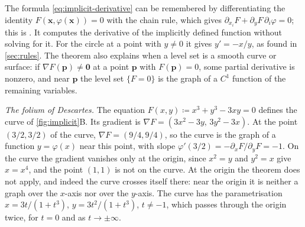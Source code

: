 The formula \eqref{eq:implicit-derivative} can be remembered by differentiating the identity $F(\mathbf x,\varphi(\mathbf x))=0$ with the chain rule, which gives $\partial_{x_i}F+\partial_yF\,\partial_i\varphi=0$; this is . It computes the derivative of the implicitly defined function without solving for it. For the circle at a point with $y\ne0$ it gives $y'=-x/y$, as found in \cref{sec:rules}. The theorem also explains when a level set is a smooth curve or surface: if $\nabla F(\mathbf p)\ne\mathbf0$ at a point $\mathbf p$ with $F(\mathbf p)=0$, some partial derivative is nonzero, and near $\mathbf p$ the level set $\{F=0\}$ is the graph of a $C^1$ function of the remaining variables.

\emph{The folium of Descartes.} The equation $F(x,y)\coloneqq x^3+y^3-3xy=0$ defines the curve of \cref{fig:implicit}B. Its gradient is $\nabla F=(3x^2-3y,\,3y^2-3x)$. At the point $(3/2,3/2)$ of the curve, $\nabla F=(9/4,9/4)$, so the curve is the graph of a function $y=\varphi(x)$ near this point, with slope $\varphi'(3/2)=-\partial_xF/\partial_yF=-1$. On the curve the gradient vanishes only at the origin, since $x^2=y$ and $y^2=x$ give $x=x^4$, and the point $(1,1)$ is not on the curve. At the origin the theorem does not apply, and indeed the curve crosses itself there: near the origin it is neither a graph over the $x$-axis nor over the $y$-axis. The curve has the parametrisation $x=3t/(1+t^3)$, $y=3t^2/(1+t^3)$, $t\ne-1$, which passes through the origin twice, for $t=0$ and as $t\to\pm\infty$.

